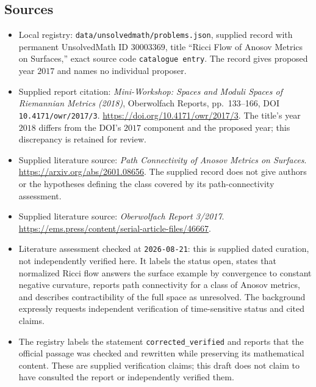 \documentclass[11pt]{article}
\begin{document}
\subsection{Sources}
\begin{itemize}
\item Local registry: \texttt{data/unsolvedmath/problems.json}, supplied record with permanent UnsolvedMath ID \(30003369\), title ``Ricci Flow of Anosov Metrics on Surfaces,'' exact source code \texttt{catalogue entry}. The record gives proposed year \(2017\) and names no individual proposer.
\item Supplied report citation: \emph{Mini-Workshop: Spaces and Moduli Spaces of Riemannian Metrics (2018)}, Oberwolfach Reports, pp.\ 133--166, DOI \texttt{10.4171/owr/2017/3}. \url{https://doi.org/10.4171/owr/2017/3}. The title's year \(2018\) differs from the DOI's \(2017\) component and the proposed year; this discrepancy is retained for review.
\item Supplied literature source: \emph{Path Connectivity of Anosov Metrics on Surfaces}. \url{https://arxiv.org/abs/2601.08656}. The supplied record does not give authors or the hypotheses defining the class covered by its path-connectivity assessment.
\item Supplied literature source: \emph{Oberwolfach Report 3/2017}. \url{https://ems.press/content/serial-article-files/46667}.
\item Literature assessment checked at \texttt{2026-08-21}: this is supplied dated curation, not independently verified here. It labels the status open, states that normalized Ricci flow answers the surface example by convergence to constant negative curvature, reports path connectivity for a class of Anosov metrics, and describes contractibility of the full space as unresolved. The background expressly requests independent verification of time-sensitive status and cited claims.
\item The registry labels the statement \texttt{corrected\_verified} and reports that the official passage was checked and rewritten while preserving its mathematical content. These are supplied verification claims; this draft does not claim to have consulted the report or independently verified them.
\end{itemize}
\end{document}

